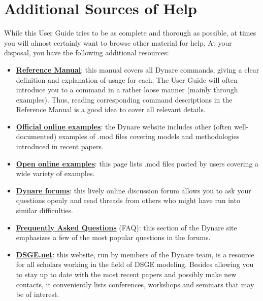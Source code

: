 \section{Additional Sources of Help}
While this User Guide tries to be as complete and thorough as possible, at times you will almost certainly want to browse other material for help. At your disposal, you have the following additional resources:
\begin{itemize}
\item \href{http://www.cepremap.cnrs.fr/juillard/mambo/download/manual/index.html}{\textbf{Reference Manual}}: this manual covers all Dynare commands, giving a clear definition and explanation of usage for each. The User Guide will often introduce you to a command in a rather loose manner (mainly through examples). Thus, reading corresponding command descriptions in the Reference Manual is a good idea to cover all relevant details. 
\item \href{http://www.cepremap.cnrs.fr/juillard/mambo/index.php?option=com_content&task=category&sectionid=11&id=96&Itemid=89}{\textbf{Official online examples}}: the Dynare website includes other (often well-documented) examples of .mod files covering models and methodologies introduced in recent papers. 
\item \href{http://www.cepremap.cnrs.fr/juillard/mambo/index.php?option=com_forum&Itemid=95&page=viewforum&f=2&sid=10290a11eb7a48243971159f5b86f83e}{\textbf{Open online examples}}: this page lists .mod files posted by users covering a wide variety of examples. 
\item \href{http://www.dynare.org/phpBB3}{\textbf{Dynare forums}}: this lively online discussion forum allows you to ask your questions openly and read threads from others who might have run into similar difficulties. 
\item \href{http://www.cepremap.cnrs.fr/juillard/mambo/index.php?option=com_content&task=section&id=3&Itemid=40}{\textbf{Frequently Asked Questions}} (FAQ): this section of the Dynare site emphasizes a few of the most popular questions in the forums. 
\item \href{http://www.dsge.net}{\textbf{DSGE.net}}: this website, run by members of the Dynare team, is a resource for all scholars working in the field of DSGE modeling. Besides allowing you to stay up to date with the most recent papers and possibly make new contacts, it conveniently lists conferences, workshops and seminars that may be of interest. 
\end{itemize}

